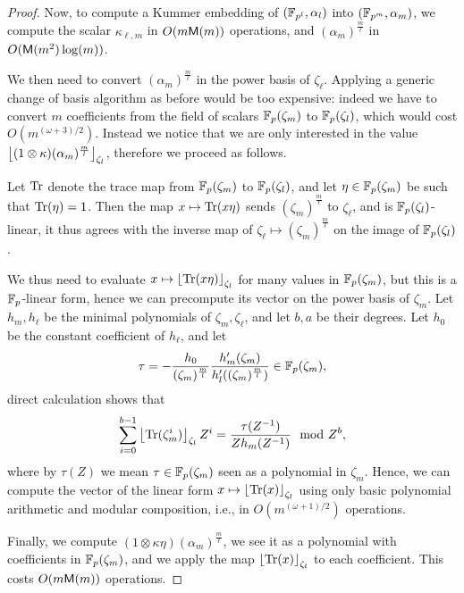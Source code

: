 \documentclass{sig-alternate}
\begin{document}
\begin{proof}
  Now, to compute a Kummer embedding of $(\mathbb{F}_{p^l},\alpha_l)$
  into $(\mathbb{F}_{p^m},\alpha_m)$, we compute the scalar $\kappa_{\ell,m}$
  in $O(m\mathsf{M}(m))$ operations, and $(\alpha_m)^{\frac{m}{\ell}}$ in
  $O(\mathsf{M}(m^2)\log(m))$. %

  We then need to convert $(\alpha_m)^{\frac{m}{\ell}}$ in the power
  basis of $\zeta_\ell$. %
  Applying a generic change of basis algorithm as before would be too
  expensive: indeed we have to convert $m$ coefficients from the field
  of scalars $\mathbb{F}_p(\zeta_m)$ to $\mathbb{F}_p(\zeta_l)$, which would cost
  $O(m^{(\omega+3)/2})$. %
  Instead we notice that we are only interested in the value
  $\left\lfloor (1\otimes\kappa)(\alpha_m)^{\frac{m}{l}} \right\rfloor_{\zeta_l}$,
  therefore we proceed as follows.

  Let $\mathrm{Tr}$ denote the trace map from $\mathbb{F}_p(\zeta_m)$ to
  $\mathbb{F}_p(\zeta_l)$, and let $\eta\in\mathbb{F}_p(\zeta_m)$ be such that
  $\mathrm{Tr}(\eta)=1$. %
  Then the map $x\mapsto \mathrm{Tr}(x\eta)$ sends
  $(\zeta_m)^{\frac{m}{\ell}}$ to $\zeta_\ell$, and is
  $\mathbb{F}_p(\zeta_l)$-linear, it thus agrees with the inverse map of
  $\zeta_\ell\mapsto(\zeta_m)^{\frac{m}{\ell}}$ on the image of
  $\mathbb{F}_p(\zeta_l)$. %
  
  We thus need to evaluate $x\mapsto\left\lfloor \mathrm{Tr}(x\eta) \right\rfloor_{\zeta_l}$
  for many values in $\mathbb{F}_p(\zeta_m)$, but this is a $\mathbb{F}_p$-linear
  form, hence we can precompute its vector on the power basis of
  $\zeta_m$. %
  Let $h_m,h_\ell$ be the minimal polynomials of $\zeta_m,\zeta_\ell$,
  and let $b,a$ be their degrees. %
  Let $h_0$ be the constant coefficient of $h_\ell$, and let
  \[\tau = -\frac{h_0}{(\zeta_m)^{\frac{m}{l}}} \frac{h_m'(\zeta_m)}{h_l'((\zeta_m)^{\frac{m}{l}})}\in\mathbb{F}_p(\zeta_m),\]
  direct calculation shows that
  \begin{equation*}
    \sum_{i=0}^{b-1} \left\lfloor \mathrm{Tr}(\zeta_m^i) \right\rfloor_{\zeta_l}Z^i = \frac{\tau(Z^{-1})}{Zh_m(Z^{-1})}  \mod Z^b,
  \end{equation*}
  where by $\tau(Z)$ we mean $\tau\in\mathbb{F}_p(\zeta_m)$ seen as a
  polynomial in $\zeta_m$. %
  Hence, we can compute the vector of the linear form
  $x\mapsto\left\lfloor \mathrm{Tr}(x) \right\rfloor_{\zeta_l}$ using only basic polynomial
  arithmetic and modular composition, i.e., in $O(m^{(\omega+1)/2})$
  operations.

  Finally, we compute
  $(1\otimes\kappa\eta)(\alpha_m)^{\frac{m}{\ell}}$, we see it as a
  polynomial with coefficients in $\mathbb{F}_p(\zeta_m)$, and we apply the
  map $\left\lfloor \mathrm{Tr}(x) \right\rfloor_{\zeta_l}$ to each coefficient. %
  This costs $O(m\mathsf{M}(m))$ operations.
\end{proof}
\end{document}
